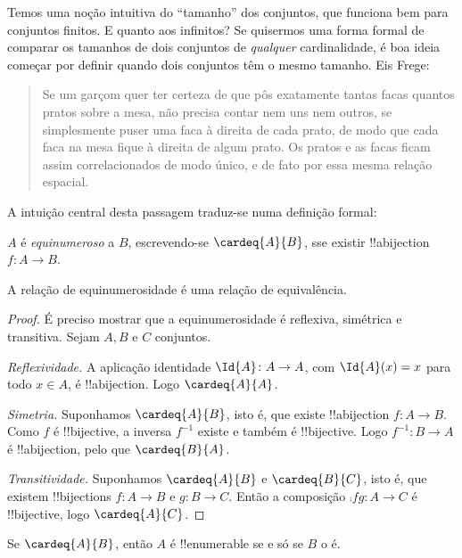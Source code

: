 \documentclass[../../../include/open-logic-section]{subfiles}
\begin{document}


Temos uma noção intuitiva do ``tamanho'' dos conjuntos, que funciona bem para
conjuntos finitos. E quanto aos infinitos? Se quisermos uma forma formal de
comparar os tamanhos de dois conjuntos de \emph{qualquer} cardinalidade, é boa
ideia começar por definir quando dois conjuntos têm o mesmo tamanho. Eis Frege:
\begin{quote}
  Se um garçom quer ter certeza de que pôs exatamente tantas facas
  quantos pratos sobre a mesa, não precisa contar nem uns nem outros, se simplesmente
  puser uma faca à direita de cada prato, de modo que cada faca na mesa fique à
  direita de algum prato. Os pratos e as facas ficam assim correlacionados de
  modo único, e de fato por essa mesma relação espacial. \citep[§~70]{Frege1884}
\end{quote}
A intuição central desta passagem traduz-se numa definição formal:

\begin{defn}
  $A$ é \emph{equinumeroso} a $B$, escrevendo-se $\cardeq{A}{B}$, sse existir
  !!a{bijection} $f \colon A \to B$.
\end{defn}

\begin{prop}
A relação de equinumerosidade é uma relação de equivalência.
\end{prop}

\begin{proof} 
É preciso mostrar que a equinumerosidade é reflexiva, simétrica e transitiva. Sejam
$A, B$ e $C$ conjuntos.

\emph{Reflexividade.} A aplicação identidade $\Id{A} \colon A \to A$, com
$\Id{A} (x) = x$ para todo $x \in A$, é !!a{bijection}. Logo $\cardeq{A}{A}$.

\emph{Simetria.} Suponhamos $\cardeq{A}{B}$, isto é, que existe !!a{bijection}
$f\colon A \to B$. Como $f$ é !!{bijective}, a inversa $f^{-1}$ existe e também é
!!{bijective}. Logo $f^{-1}\colon B \to A$ é !!a{bijection}, pelo que
$\cardeq{B}{A}$.

\emph{Transitividade.} Suponhamos $\cardeq{A}{B}$ e $\cardeq{B}{C}$, isto é, que
existem !!{bijection}s $f\colon A \to B$ e $g\colon B \to C$. Então a composição
$\comp{f}{g}\colon A \to C$ é !!{bijective}, logo $\cardeq{A}{C}$.
\end{proof}

\begin{prop}
Se $\cardeq{A}{B}$, então $A$ é !!{enumerable} se e só se $B$ o é.
\end{prop}
\end{document}

